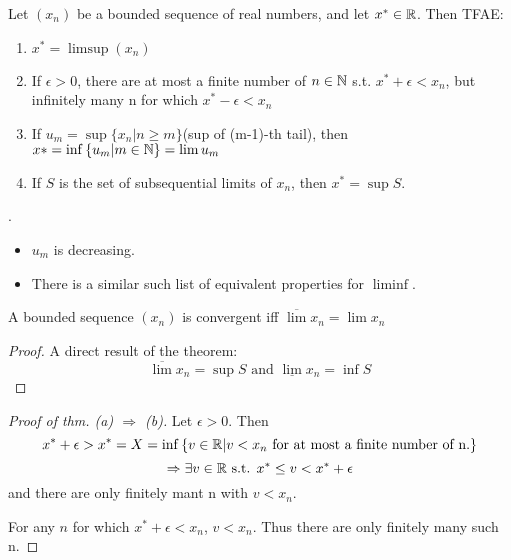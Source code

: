 \documentclass[a4paper,12pt]{article}
\begin{document}
    \begin{theorem}
        Let \((x_n)\) be a bounded sequence of real numbers, and let \(x^*\in\mathbb{R}\). Then TFAE:
        \begin{enumerate}
            \item \(x^* = \limsup(x_n)\)
            \item If \(\epsilon>0\), there are at most a finite number of \(n\in\mathbb{N}\) s.t.
            \(x^*+\epsilon <x_n\), but infinitely many n for which \(x^* - \epsilon<x_n\)
            \item If \(u_m=\sup{\{x_n|n\ge m\}}\)(sup of (m-1)-th tail), then \(x*=\inf{\{u_m|m\in\mathbb{N}\}} = \lim{u_m}\)
            \item If \(S\) is the set of subsequential limits of \(x_n\), then \(x^*=\sup S\).\\
        \end{enumerate}

        \begin{remark}
            .
            \begin{itemize}
                \item \(u_m\) is decreasing.
                \item There is a similar such list of equivalent properties for \(\liminf\).\\
            \end{itemize}
        \end{remark}
    
        \begin{corollary}
            A bounded sequence \((x_n)\) is convergent iff \(\overline{\lim}x_n = \lim x_n\)
            \begin{proof}
                A direct result of the theorem:\[\overline{\lim}x_n=\sup{S} \text{ and } \underline{\lim}x_n=\inf{S}\]
            \end{proof}
        \end{corollary}

        \begin{proof}[Proof of thm. (a) \(\Rightarrow\) (b)]
            Let \(\epsilon >0\). Then
            \[x^*+\epsilon>x^* = X =\inf{\{v\in\mathbb{R}| v<x_n \text{ for at most a finite number of n.}\}}\]
            \[\Rightarrow \exists v\in\mathbb{R} \text{ s.t. } x^*\le v < x^*+\epsilon\]
            and there are only finitely mant n with \(v<x_n\).
            
            For any \(n\) for which \(x^*+\epsilon < x_n\), \(v<x_n\). Thus there are only finitely many such n.


\end{proof}
\end{theorem}
\end{document}
